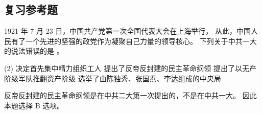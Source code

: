 \documentclass[10pt, UTF8]{book} %
\begin{document}
\subsection{复习参考题}

\begin{example}
    1921 年 7 月 23 日，中国共产党第一次全国代表大会在上海举行，
    从此，中国人民有了一个先进的坚强的政党作为凝聚自己力量的领导核心。
    下列关于中共一大的说法错误的是 \underline{\qquad \qquad \qquad}。
    \begin{tasks}[label={\Alph*.}](2)
        \task 决定首先集中精力组织工人
        \task 提出了反帝反封建的民主革命纲领
        \task 提出了以无产阶级军队推翻资产阶级
        \task 选举了由陈独秀、张国焘、李达组成的中央局
    \end{tasks}
    \begin{cmt}
        反帝反封建的民主革命纲领是在中共二大第一次提出的，不是在中共一大。
        因此本题选择 B 选项。
    \end{cmt}
\end{example}






    




\end{document}
